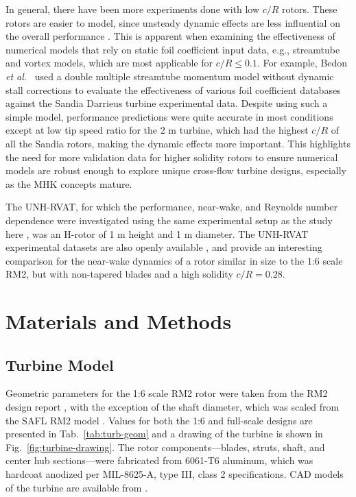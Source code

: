 \documentclass[10pt,letterpaper]{article}
\begin{document}
In general, there have been more experiments done with low $c/R$ rotors. These
rotors are easier to model, since unsteady dynamic effects are less influential
on the overall performance \cite{Strickland1981}. This is apparent when
examining the effectiveness of numerical models that rely on static foil
coefficient input data, e.g., streamtube and vortex models, which are most
applicable for $c/R \leq 0.1$. For example, Bedon \emph{et al.}~\cite{Bedon2014}
used a double multiple streamtube momentum model without dynamic stall
corrections to evaluate the effectiveness of various foil coefficient databases
against the Sandia Darrieus turbine experimental data. Despite using such a
simple model, performance predictions were quite accurate in most conditions
except at low tip speed ratio for the 2 m turbine, which had the highest $c/R$
of all the Sandia rotors, making the dynamic effects more important. This
highlights the need for more validation data for higher solidity rotors to
ensure numerical models are robust enough to explore unique cross-flow turbine
designs, especially as the MHK concepts mature.

The UNH-RVAT, for which the performance, near-wake, and Reynolds number
dependence were investigated using the same experimental setup as the study
here \cite{Bachant2015-JoT, Bachant2016-Energies}, was an H-rotor of 1 m height
and 1 m diameter. The UNH-RVAT experimental datasets are also openly available
\cite{Bachant2014-RVAT-baseline, Bachant2016-RVAT-Re-dep}, and provide an
interesting comparison for the near-wake dynamics of a rotor similar in size to
the 1:6 scale RM2, but with non-tapered blades and a high solidity $c/R = 0.28$.


\section*{Materials and Methods}

\subsection*{Turbine Model}

Geometric parameters for the 1:6 scale RM2 rotor were taken from the RM2 design
report \cite{Barone2011}, with the exception of the shaft diameter, which was
scaled from the SAFL RM2 model \cite{Hill2014}. Values for both the 1:6 and
full-scale designs are presented in Tab.~\ref{tab:turb-geom} and a drawing of
the turbine is shown in Fig.~\ref{fig:turbine-drawing}. The rotor
components---blades, struts, shaft, and center hub sections---were fabricated
from 6061-T6 aluminum, which was hardcoat anodized per MIL-8625-A, type III,
class 2 specifications. CAD models of the turbine are available from
\cite{Bachant2015-RM2-CAD}.
\end{document}
